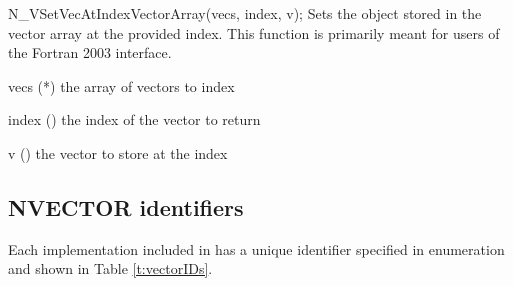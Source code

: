 {
  N\_VSetVecAtIndexVectorArray(vecs, index, v);
}
{
  Sets the  object stored in the vector array at the
  provided index. This function is primarily meant for users of the
  Fortran 2003 interface.
}
{
  \begin{args}[count]
  \item[vecs] (*) the array of vectors to index
  \item[index] () the index of the vector to return
  \item[v] () the vector to store at the index
  \end{args}
}
{}
{}


\subsection{NVECTOR identifiers}
\label{ss:nvecIDs}

Each {\nvector} implementation included in {\sundials} has a
unique identifier specified in enumeration and shown in Table \ref{t:vectorIDs}.

